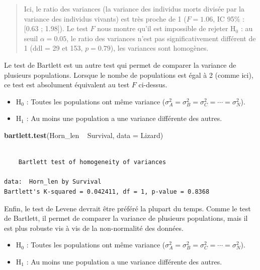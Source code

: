 \documentclass[a4paperpaper,]{article}
\newenvironment{Shaded}{\begin{snugshade}}{\end{snugshade}}
\newcommand{\DataTypeTok}[1]{\textcolor[rgb]{0.00,0.34,0.68}{#1}}
\newcommand{\KeywordTok}[1]{\textcolor[rgb]{0.12,0.11,0.11}{\textbf{#1}}}
\newcommand{\NormalTok}[1]{\textcolor[rgb]{0.12,0.11,0.11}{#1}}
\newcommand{\OperatorTok}[1]{\textcolor[rgb]{0.12,0.11,0.11}{#1}}
\newcommand{\StringTok}[1]{\textcolor[rgb]{0.75,0.01,0.01}{#1}}
\providecommand{\tightlist}{%
  \setlength{\itemsep}{0pt}\setlength{\parskip}{0pt}}
\begin{document}
\begin{quote}
Ici, le ratio des variances (la variance des individus morts divisée par la variance des individus vivants) est très proche de 1 (\(F = 1.06\), IC 95\% : {[}0.63 ; 1.98{]}). Le test \(F\) nous montre qu'il est impossible de rejeter H\(_0\) : au seuil \(\alpha = 0.05\), le ratio des variances n'est pas significativement différent de 1 (ddl = 29 et 153, \(p = 0.79\)), les variances sont homogènes.
\end{quote}

Le test de Bartlett est un autre test qui permet de comparer la variance de plusieurs populations. Lorsque le nombe de populations est égal à 2 (comme ici), ce test est absolument équivalent au test \(F\) ci-dessus.

\begin{itemize}
\tightlist
\item
  H\(_0\) : Toutes les populations ont même variance (\(\sigma^2_A = \sigma^2_B = \sigma^2_C = \cdots = \sigma^2_N\)).
\item
  H\(_1\) : Au moins une population a une variance différente des autres.
\end{itemize}

\begin{Shaded}
\begin{Highlighting}[]
\KeywordTok{bartlett.test}\NormalTok{(Horn_len }\OperatorTok{~}\StringTok{ }\NormalTok{Survival, }\DataTypeTok{data =}\NormalTok{ Lizard)}
\end{Highlighting}
\end{Shaded}

\begin{verbatim}

    Bartlett test of homogeneity of variances

data:  Horn_len by Survival
Bartlett's K-squared = 0.042411, df = 1, p-value = 0.8368
\end{verbatim}

Enfin, le test de Levene devrait être préféré la plupart du temps. Comme le test de Bartlett, il permet de comparer la variance de plusieurs populations, mais il est plus robuste vis à vis de la non-normalité des données.

\begin{itemize}
\tightlist
\item
  H\(_0\) : Toutes les populations ont même variance (\(\sigma^2_A = \sigma^2_B = \sigma^2_C = \cdots = \sigma^2_N\)).
\item
  H\(_1\) : Au moins une population a une variance différente des autres.
\end{itemize}
\end{document}

